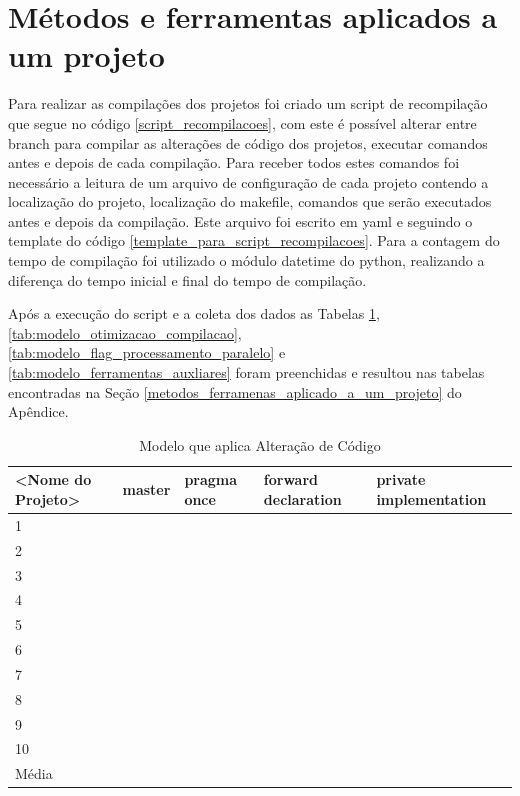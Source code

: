 \section{Métodos e ferramentas aplicados a um projeto}
\label{metodos_ferramentas_aplicados_a_um_projeto_template}

Para realizar as compilações dos projetos foi criado um script de recompilação que
 segue no código \ref{script_recompilacoes}, com este é possível alterar entre
 branch para compilar as alterações de código dos projetos,
 executar comandos antes e depois de cada compilação.
 Para receber todos estes comandos foi necessário a leitura de um arquivo de
 configuração de cada projeto contendo a localização do projeto,
 localização do makefile, comandos que serão executados antes e depois
 da compilação.
 Este arquivo foi escrito em yaml e seguindo o template do código
 \ref{template_para_script_recompilacoes}.
Para a contagem do tempo de compilação foi utilizado o módulo datetime do python,
 realizando a diferença do tempo inicial e final do tempo de compilação.

	Após a execução do script e a coleta dos dados as Tabelas \ref{tab:modelo_alteracao_de_codigo},
 \ref{tab:modelo_otimizacao_compilacao}, \ref{tab:modelo_flag_processamento_paralelo} e
\ref{tab:modelo_ferramentas_auxliares} foram preenchidas e resultou nas tabelas encontradas na Seção 
\ref{metodos_ferramenas_aplicado_a_um_projeto} do Apêndice.

\begin{table}[!ht]
\centering
\tiny
\caption{Modelo que aplica Alteração de Código}
\label{tab:modelo_alteracao_de_codigo}
\begin{tabular}{lllll}
\textbf{<Nome do Projeto>} & \textbf{master} & \textbf{pragma once} & \textbf{forward declaration} & \textbf{private implementation}   \\ \toprule
1                             &      &     &     &        \\ 
2                             &      &     &     &        \\ 
3                             &      &     &     &        \\ 
4                             &      &     &     &        \\ 
5                             &      &     &     &        \\ 
6                             &      &     &     &        \\ 
7                             &      &     &     &        \\ 
8                             &      &     &     &        \\ 
9                             &      &     &     &        \\ 
10                            &      &     &     &        \\ \bottomrule
Média                         &      &     &     &        \\ 
\end{tabular}
\end{table}


